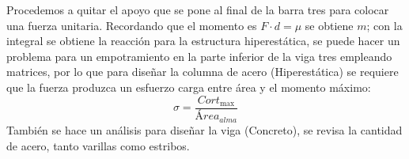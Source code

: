 Procedemos a quitar el apoyo que se pone al final de la barra tres para colocar una fuerza unitaria. Recordando que el momento es $F\cdot d=\mu$ se obtiene $m$; con la integral se obtiene la reacción para la estructura hiperestática, se puede  hacer un problema para un empotramiento en la parte inferior de la viga tres empleando matrices, por lo que para diseñar la columna de acero (Hiperestática) se requiere que la fuerza produzca un esfuerzo carga entre área y el momento máximo:
\begin{equation}
    \sigma=\frac{Cort_{\max}}{Área_{alma}}
\end{equation}
También se hace un análisis para diseñar la viga (Concreto), se revisa la cantidad de acero, tanto varillas como estribos.





